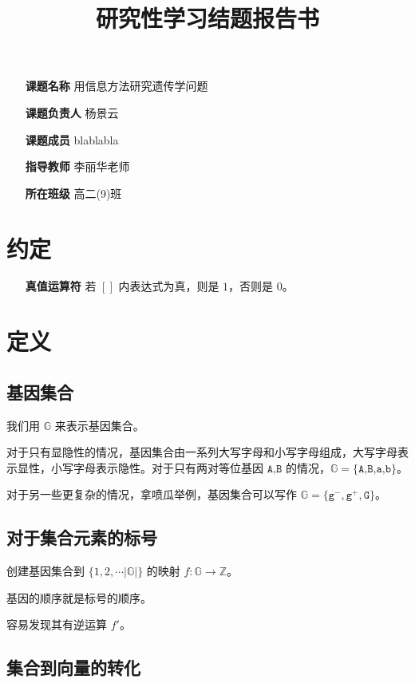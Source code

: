 \documentclass{article}
\title{研究性学习结题报告书}
\author{}
\begin{document}
	\maketitle
	\begin{itemize}
		\item[\textbf{课题名称}] 用信息方法研究遗传学问题 \centering
		\item[\textbf{课题负责人}] 杨景云
		\item[\textbf{课题成员}] blablabla
		\item[\textbf{指导教师}] 李丽华老师
		\item[\textbf{所在班级}] 高二(9)班
	\end{itemize}
	\newpage
	\section{约定}
		\begin{itemize}
			\item[\textbf{真值运算符}] 若 $[]$ 内表达式为真，则是 $1$，否则是 $0$。
		\end{itemize}
	\section{定义}
	
	\subsection{基因集合}

	我们用 $\mathbb{G}$ 来表示基因集合。

	对于只有显隐性的情况，基因集合由一系列大写字母和小写字母组成，大写字母表示显性，小写字母表示隐性。对于只有两对等位基因 $\texttt{A,B}$ 的情况，$\mathbb{G}=\{\texttt{A,B,a,b}\}$。

	对于另一些更复杂的情况，拿喷瓜举例，基因集合可以写作 $\mathbb{G}=\{\texttt{g}^{-},\texttt{g}^{+},\texttt{G}\}$。
	
	\subsection{对于集合元素的标号}

	创建基因集合到 $\{1,2,\cdots |\mathbb{G}|\}$ 的映射 $f:\mathbb{G} \to \mathbb{Z}$。

	基因的顺序就是标号的顺序。
	
	容易发现其有逆运算 $f'$。

	\subsection{集合到向量的转化}
\end{document}
